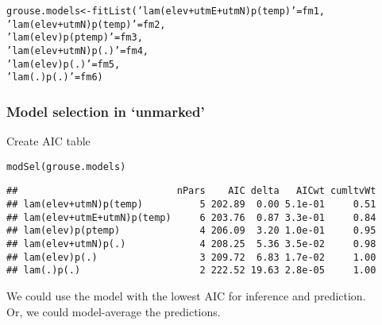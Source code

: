 \documentclass[color=usenames,dvipsnames]{beamer}\usepackage[]{graphicx}\usepackage[]{xcolor}
\makeatletter
\newcommand{\hlsng}[1]{\textcolor[rgb]{0.749,0.012,0.012}{#1}}%
\newcommand{\hldef}[1]{\textcolor[rgb]{0,0,0}{#1}}%
\newcommand{\hlkwb}[1]{\textcolor[rgb]{0,0.341,0.682}{#1}}%
\newcommand{\hlkwd}[1]{\textcolor[rgb]{0.004,0.004,0.506}{#1}}%
\newenvironment{kframe}{%
 \def\at@end@of@kframe{}%
 \ifinner\ifhmode%
  \def\at@end@of@kframe{\end{minipage}}%
  \begin{minipage}{\columnwidth}%
 \fi\fi%
 \def\FrameCommand##1{\hskip\@totalleftmargin \hskip-\fboxsep
 \colorbox{shadecolor}{##1}\hskip-\fboxsep
     \hskip-\linewidth \hskip-\@totalleftmargin \hskip\columnwidth}%
 \MakeFramed {\advance\hsize-\width
   \@totalleftmargin\z@ \linewidth\hsize
   \@setminipage}}%
 {\par\unskip\endMakeFramed%
 \at@end@of@kframe}
\newenvironment{knitrout}{}{} %
\makeatother
\begin{document}
\begin{frame}[fragile]
\begin{knitrout}
\begin{kframe}
\begin{alltt}
\hldef{grouse.models} \hlkwb{<-} \hlkwd{fitList}\hldef{(}\hlsng{'lam(elev+utmE+utmN)p(temp)'}\hldef{=fm1,}
                         \hlsng{'lam(elev+utmN)p(temp)'}\hldef{=fm2,}
                         \hlsng{'lam(elev)p(ptemp)'}\hldef{=fm3,}
                         \hlsng{'lam(elev+utmN)p(.)'}\hldef{=fm4,}
                         \hlsng{'lam(elev)p(.)'}\hldef{=fm5,}
                         \hlsng{'lam(.)p(.)'}\hldef{=fm6)}
\end{alltt}
\end{kframe}
\end{knitrout}
\end{frame}




\begin{frame}[fragile]
  \frametitle{Model selection in `unmarked'}
  \small
  Create AIC table
\begin{knitrout}\scriptsize
{}\color{fgcolor}\begin{kframe}
\begin{alltt}
\hlkwd{modSel}\hldef{(grouse.models)}
\end{alltt}
\begin{verbatim}
##                            nPars    AIC delta   AICwt cumltvWt
## lam(elev+utmN)p(temp)          5 202.89  0.00 5.1e-01     0.51
## lam(elev+utmE+utmN)p(temp)     6 203.76  0.87 3.3e-01     0.84
## lam(elev)p(ptemp)              4 206.09  3.20 1.0e-01     0.95
## lam(elev+utmN)p(.)             4 208.25  5.36 3.5e-02     0.98
## lam(elev)p(.)                  3 209.72  6.83 1.7e-02     1.00
## lam(.)p(.)                     2 222.52 19.63 2.8e-05     1.00
\end{verbatim}
\end{kframe}
\end{knitrout}
  \pause
  \vfill
  We could use the model with the lowest AIC for inference and
  prediction. \\ 
  \pause
  \vfill
  Or, we could model-average the predictions. \\
\end{frame}


\end{document}
